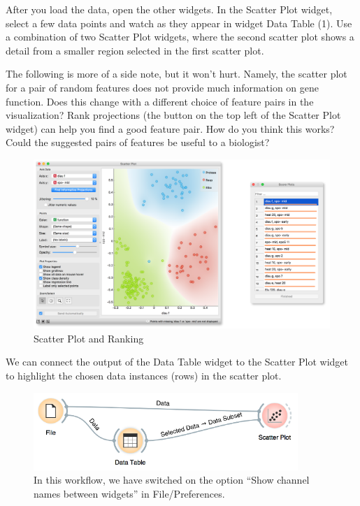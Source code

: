 After you load the data, open the other widgets. In the Scatter Plot widget, select a few data points and watch as they appear in widget Data Table (1). Use a combination of two Scatter Plot widgets, where the second scatter plot shows a detail from a smaller region selected in the first scatter plot.

The following is more of a side note, but it won’t hurt. Namely, the scatter plot for a pair of random features does not provide much information on gene function. Does this change with a different choice of feature pairs in the visualization? Rank projections (the button on the top left of the Scatter Plot widget) can help you find a good feature pair. How do you think this works? Could the suggested pairs of features be useful to a biologist?

\begin{figure}[h]
  \centering
  \includegraphics[width=\linewidth]{graphics/ch-workflows/workflow-fig4b.png}
  \caption{Scatter Plot and Ranking}
  \label{fig:workflow-fig4}
\end{figure}


We can connect the output of the Data Table widget to the Scatter Plot widget to highlight the chosen data instances (rows) in the scatter plot.

\begin{figure}
  \includegraphics[width=100mm]{graphics/ch-workflows/workflow-fig5.png}
  \caption{In this workflow, we have switched on the option “Show channel names between widgets” in File/Preferences.}
  \label{fig:workflow-fig5}
\end{figure}

